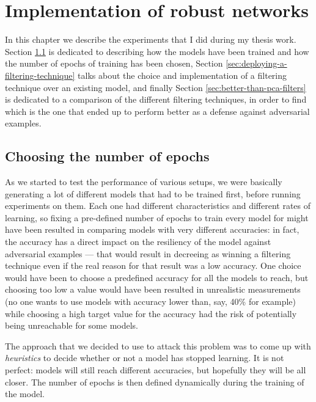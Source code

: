 \chapter{Implementation of robust networks}
\label{ch:implementation-of-robust-networks}

In this chapter we describe the experiments that I did during my thesis
work. Section \ref{sec:choosing-the-number-of-epochs} is dedicated to
describing how the models have been trained and how the number of
epochs of training has been chosen, Section
\ref{sec:deploying-a-filtering-technique} talks about the choice and
implementation of a filtering technique over an existing model, and
finally Section \ref{sec:better-than-pca-filters} is dedicated to a comparison
of the different filtering techniques, in order to find which is the
one that ended up to perform better as a defense against adversarial
examples.

\section{Choosing the number of epochs}
\label{sec:choosing-the-number-of-epochs}

As we started to test the performance of various setups, we were
basically generating a lot of different models that had to be trained
first, before running experiments on them. Each one had different
characteristics and different rates of learning, so fixing a
pre-defined number of epochs to train every model for might have been
resulted in comparing models with very different accuracies: in fact,
the accuracy has a direct impact on the resiliency of the model against
adversarial examples --- that would result in decreeing as winning a
filtering technique even if the real reason for that result was a low
accuracy. One choice would have been to choose a predefined accuracy
for all the models to reach, but choosing too low a value would have
been resulted in unrealistic measurements (no one wants to use models
with accuracy lower than, say, 40\% for example) while choosing a high
target value for the accuracy had the risk of potentially being
unreachable for some models.

The approach that we decided to use to attack this problem was to come
up with \emph{heuristics} to decide whether or not a model has stopped
learning. It is not perfect: models will still reach different
accuracies, but hopefully they will be all closer. The number of epochs
is then defined dynamically during the training of the model.

